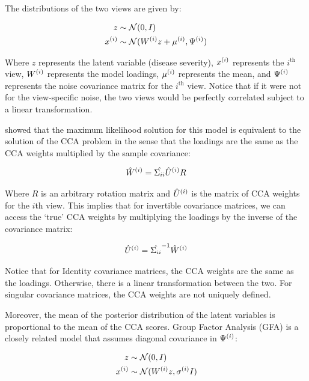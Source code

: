 The distributions of the two views are given by:

\begin{align}
    z& \sim \mathcal{N}(0, I)\\
    x^{(i)} & \sim \mathcal{N}(W^{(i)} z + \mu^{(i)}, \Psi^{(i)})
\end{align}

Where \(z\) represents the latent variable (disease severity), \(x^{(i)}\) represents the $i^{\text{th}}$ view, \(W^{(i)}\) represents the model loadings, \(\mu^{(i)}\) represents the mean, and \(\Psi^{(i)}\) represents the noise covariance matrix for the $i^{\text{th}}$ view. 
Notice that if it were not for the view-specific noise, the two views would be perfectly correlated subject to a linear transformation.

\cite{bach2005probabilistic} showed that the maximum likelihood solution for this model is equivalent to the solution of the CCA problem in the sense that the loadings are the same as the CCA weights multiplied by the sample covariance:

\begin{align}\label{eq:probabilistic-cca}
    \hat{W}^{(i)} = \hat{\Sigma_{ii}} \hat{U}^{(i)} R
\end{align}

Where $R$ is an arbitrary rotation matrix and $\hat{U}^{(i)}$ is the matrix of CCA weights for the $i$th view.
This implies that for invertible covariance matrices, we can access the `true' CCA weights by multiplying the loadings by the inverse of the covariance matrix:

\begin{align}
    \hat{U}^{(i)} = \hat{\Sigma_{ii}}^{-1} \hat{W}^{(i)}
\end{align}

Notice that for Identity covariance matrices, the CCA weights are the same as the loadings.
Otherwise, there is a linear transformation between the two.
For singular covariance matrices, the CCA weights are not uniquely defined.

Moreover, the mean of the posterior distribution of the latent variables is proportional to the mean of the CCA scores\cite{klami2013bayesian}.
Group Factor Analysis (GFA) is a closely related model that assumes diagonal covariance in $\Psi^{(i)}$:

\begin{align}
    z& \sim \mathcal{N}(0, I)\\
    x^{(i)} & \sim \mathcal{N}(W^{(i)} z, \sigma^{(i)}I)
\end{align}

